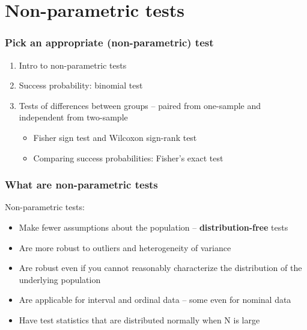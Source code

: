 \documentclass[xcolor=table,dvipsnames]{beamer}
\begin{document}
\section{Non-parametric tests}


\begin{frame}
\frametitle{Pick an appropriate (non-parametric) test}
\begin{enumerate}
\item Intro to non-parametric tests
\item Success probability: binomial test
\item Tests of differences between groups -- paired from one-sample and independent from two-sample
\begin{itemize}
	\item Fisher sign test and Wilcoxon sign-rank test
	\item Comparing success probabilities: Fisher's exact test
\end{itemize}
\end{enumerate}
\end{frame}

\begin{frame}
\frametitle{What are non-parametric tests}
Non-parametric tests: 
\begin{itemize}
\item Make fewer assumptions about the population -- \textbf{distribution-free} tests \pause 
\item Are more robust to outliers and heterogeneity of variance \pause
\item Are robust even if you cannot reasonably characterize the distribution of the underlying population \pause
\item Are applicable for interval and ordinal data -- some even for nominal data \pause
\item Have test statistics that are distributed normally when N is large
\end{itemize}
\end{frame}
\end{document}
